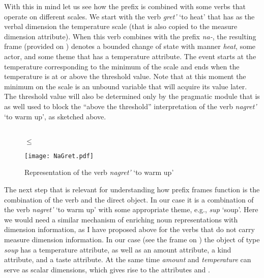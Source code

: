 With this in mind let us see how the prefix is combined with some verbs that operate on different scales. We start with the verb \textit{gret'} `to heat' that has as the verbal dimension the temperature scale (that is also copied to the measure dimension attribute). When this verb combines with the prefix \textit{na-}, the resulting frame (provided on ) denotes a bounded change of state with manner \textit{heat}, some actor, and some theme that has a temperature attribute. The event starts at the temperature corresponding to the minimum of the scale and ends when the temperature is at or above the threshold value. Note that at this moment the minimum on the scale is an unbound variable that will acquire its value later. The threshold value will also be determined only by the pragmatic module that is as well used to block the ``above the threshold'' interpretation of the verb \textit{nagret'} `to warm up', as sketched above.

\begin{figure}
\begin{minipage}{0.50\textwidth}
\\
\centering
{} $\leq$ \\
\end{minipage}
\begin{minipage}{0.45\textwidth}
\texttt{[image: NaGret.pdf]}
\end{minipage}
\caption{Representation of the verb \textit{nagret'} `to warm up' \label{frame:nagret}}
\end{figure}

The next step that is relevant for understanding how prefix frames function is the combination of the verb and the direct object. In our case it is a combination of the verb \textit{nagret'} `to warm up' with some appropriate theme, e.g., \textit{sup} `soup'. Here we would need a similar mechanism of enriching noun representations with dimension information, as I have proposed above for the verbs that do not carry measure dimension information. In our case (see the frame on ) the object of type \textit{soup} has a temperature attribute, as well as an amount attribute, a kind attribute, and a taste attribute. At the same time \textit{amount} and \textit{temperature} can serve as scalar dimensions, which gives rise to the attributes \AMOUNTDIM and \TEMPDIM.  

